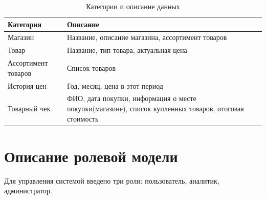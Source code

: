 \documentclass[a4paper,14pt]{extreport}
\begin{document}
\captionsetup[table]{skip=-12pt}
\captionsetup{singlelinecheck = false, justification=raggedright}
\begin{table}[H]
	\caption{Категории и описание данных}
	\begin{center}
		\begin{tabular}{| l | p{11 cm} |} 
			\hline
			
			\textbf{Категория} & \textbf{Описание} \\  
			
			\hline
			
			Магазин & Название, описание магазина, ассортимент товаров \\
			
			\hline
			
			Товар & Название, тип товара, актуальная цена \\
			
			\hline
			
			Ассортимент товаров & Список товаров \\
			
			\hline
			
			История цен & Год, месяц, цена в этот период \\
			
			\hline
			
			Товарный чек & ФИО, дата покупки, информация о месте покупки(магазине), список купленных товаров, итоговая стоимость \\
			\hline
		\end{tabular}
	\end{center}
\end{table}


\section{Описание ролевой модели}

Для управления системой введено три роли: пользователь, аналитик, администратор.
\end{document}
